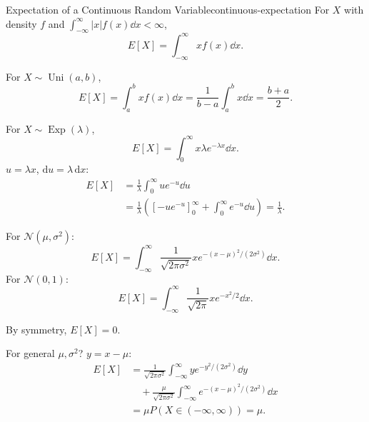 \begin{definition}{Expectation of a Continuous Random Variable}{continuous-expectation}
  For $X$ with density $f$ and $\int_{-\infty}^{\infty}|x|f(x)\dd{x}<\infty$,
  \[
    E[X]=\int_{-\infty}^{\infty}xf(x)\dd{x}.
  \]
\end{definition}

\begin{example}
  For $X\sim\operatorname{Uni}(a,b)$,
  \[
    E[X]=\int_a^b xf(x)\dd{x}
    =\frac1{b-a}\int_a^b x\dd{x}=\frac{b+a}2.
  \]
\end{example}

\begin{example}
  For $X\sim\operatorname{Exp}(\lambda)$,
  \[
    E[X]=\int_0^{\infty}x\lambda e^{-\lambda x}\dd{x}.
  \]
  $u=\lambda x$, $\mathrm{d}u=\lambda\,\mathrm{d}x$:
  \begin{align*}
    E[X] & =\frac1\lambda\int_0^{\infty}ue^{-u}\dd{u}           \\
         & =\frac1\lambda\left(\left[-ue^{-u}\right]_0^{\infty}
    +\int_0^{\infty}e^{-u}\dd{u}\right)=\frac1\lambda.
  \end{align*}
\end{example}

\begin{example}
  For $\mathcal{N}(\mu,\sigma^2)$:
  \[
    E[X]=\int_{-\infty}^{\infty}\frac1{\sqrt{2\pi\sigma^2}}
    xe^{-(x-\mu)^2/(2\sigma^2)}\dd{x}.
  \]
  For $\mathcal{N}(0,1)$:
  \[
    E[X]=\int_{-\infty}^{\infty}\frac1{\sqrt{2\pi}}xe^{-x^2/2}\dd{x}.
  \]
  \begin{center}
  \end{center}
  By symmetry, $E[X]=0$.

  For general $\mu,\sigma^2$? $y=x-\mu$:
  \begin{align*}
    E[X] & =\frac1{\sqrt{2\pi\sigma^2}}
    \int_{-\infty}^{\infty}ye^{-y^2/(2\sigma^2)}\dd{y}      \\
         & \quad+\frac\mu{\sqrt{2\pi\sigma^2}}
    \int_{-\infty}^{\infty}e^{-(x-\mu)^2/(2\sigma^2)}\dd{x} \\
         & =\mu P(X\in(-\infty,\infty))=\mu.
  \end{align*}
\end{example}
